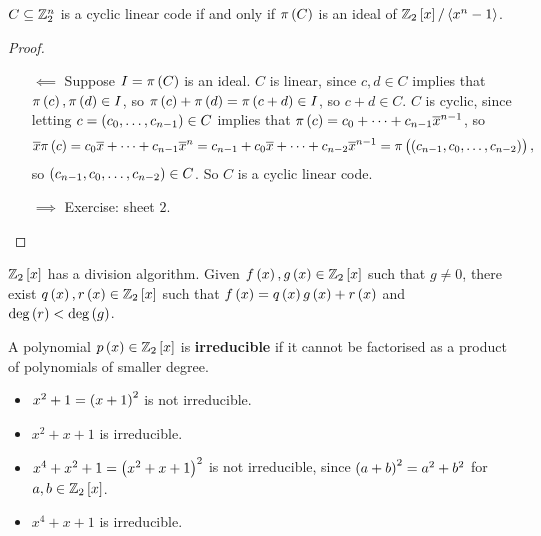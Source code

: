 \begin{proposition}
\label{prop:1.29}
$ C \subseteq \mathbb{Z}_2^n $ is a cyclic linear code if and only if $ \pi\br{C} $ is an ideal of $ \Z_2\sbr{x} / \abr{x^n - 1} $.
\end{proposition}

\begin{proof}
\hfill
\begin{itemize}
\item[$ \impliedby $] Suppose $ I = \pi\br{C} $ is an ideal. $ C $ is linear, since $ c, d \in C $ implies that $ \pi\br{c}, \pi\br{d} \in I $, so $ \pi\br{c} + \pi\br{d} = \pi\br{c + d} \in I $, so $ c + d \in C $. $ C $ is cyclic, since letting $ c = \br{c_0, \dots, c_{n - 1}} \in C $ implies that $ \pi\br{c} = c_0 + \dots + c_{n - 1}\overline{x}^{n - 1} $, so
$$ \overline{x}\pi\br{c} = c_0\overline{x} + \dots + c_{n - 1}\overline{x}^n = c_{n - 1} + c_0\overline{x} + \dots + c_{n - 2}\overline{x}^{n - 1} = \pi\br{\br{c_{n - 1}, c_0, \dots, c_{n - 2}}}, $$
so $ \br{c_{n - 1}, c_0, \dots, c_{n - 2}} \in C $. So $ C $ is a cyclic linear code.
\item[$ \implies $] Exercise: sheet $ 2 $.
\end{itemize}
\end{proof}


\begin{fact*}
$ \Z_2\sbr{x} $ has a division algorithm. Given $ f\br{x}, g\br{x} \in \Z_2\sbr{x} $ such that $ g \ne 0 $, there exist $ q\br{x}, r\br{x} \in \Z_2\sbr{x} $ such that $ f\br{x} = q\br{x}g\br{x} + r\br{x} $ and $ \deg\br{r} < \deg\br{g} $.
\end{fact*}

\begin{definition*}
A polynomial $ p\br{x} \in \Z_2\sbr{x} $ is \textbf{irreducible} if it cannot be factorised as a product of polynomials of smaller degree.
\end{definition*}

\begin{example*}
\hfill
\begin{itemize}
\item $ x^2 + 1 = \br{x + 1}^2 $ is not irreducible.
\item $ x^2 + x + 1 $ is irreducible.
\item $ x^4 + x^2 + 1 = \br{x^2 + x + 1}^2 $ is not irreducible, since $ \br{a + b}^2 = a^2 + b^2 $ for $ a, b \in \Z_2\sbr{x} $.
\item $ x^4 + x + 1 $ is irreducible.
\end{itemize}
\end{example*}


